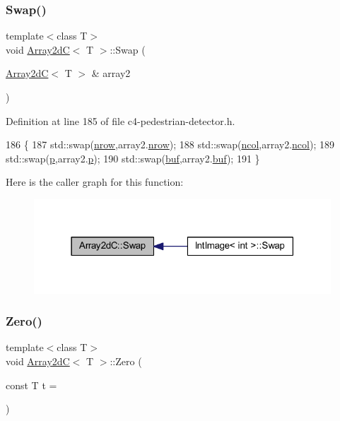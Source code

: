 \subsubsection{\texorpdfstring{Swap()}{Swap()}}
{\footnotesize\ttfamily template$<$class T$>$ \\
void \mbox{\hyperlink{class_array2d_c}{Array2dC}}$<$ T $>$\+::Swap (\begin{DoxyParamCaption}\item[{\mbox{\hyperlink{class_array2d_c}{Array2dC}}$<$ T $>$ \&}]{array2 }\end{DoxyParamCaption})}



Definition at line 185 of file c4-\/pedestrian-\/detector.\+h.


\begin{DoxyCode}
186 \{
187     std::swap(\mbox{\hyperlink{class_array2d_c_a12f690f7195f7674a86a7e1eedbc473c}{nrow}},array2.\mbox{\hyperlink{class_array2d_c_a12f690f7195f7674a86a7e1eedbc473c}{nrow}});
188     std::swap(\mbox{\hyperlink{class_array2d_c_a27e0f8f40f644831cd7c750db59dc28a}{ncol}},array2.\mbox{\hyperlink{class_array2d_c_a27e0f8f40f644831cd7c750db59dc28a}{ncol}});
189     std::swap(\mbox{\hyperlink{class_array2d_c_a727eae5d663d463635cc150e6f771f0d}{p}},array2.\mbox{\hyperlink{class_array2d_c_a727eae5d663d463635cc150e6f771f0d}{p}});
190     std::swap(\mbox{\hyperlink{class_array2d_c_a25d8fa5049d4c7ded126e0acdd18f37a}{buf}},array2.\mbox{\hyperlink{class_array2d_c_a25d8fa5049d4c7ded126e0acdd18f37a}{buf}});
191 \}
\end{DoxyCode}
Here is the caller graph for this function\+:
\nopagebreak
\begin{figure}[H]
\begin{center}
\leavevmode
\includegraphics[width=315pt]{class_array2d_c_ae8cbeb3e4fdc3a45cc188ecc1b317919_icgraph}
\end{center}
\end{figure}
\mbox{\label{class_array2d_c_a5e1d7837fd208699694fc3fc97151df0}} 
\subsubsection{\texorpdfstring{Zero()}{Zero()}}
{\footnotesize\ttfamily template$<$class T$>$ \\
void \mbox{\hyperlink{class_array2d_c}{Array2dC}}$<$ T $>$\+::Zero (\begin{DoxyParamCaption}\item[{const T}]{t = {} }\end{DoxyParamCaption})}



